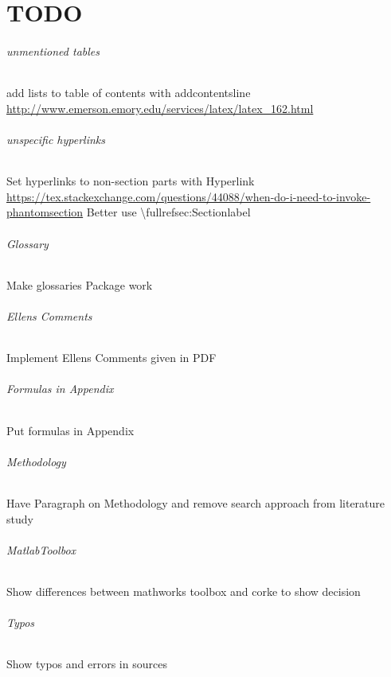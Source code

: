 \part{TODO}

\paragraph{unmentioned tables}
add lists to table of contents with addcontentsline
\url{http://www.emerson.emory.edu/services/latex/latex_162.html}

\paragraph{unspecific hyperlinks}
Set hyperlinks to non-section parts with Hyperlink
\url{https://tex.stackexchange.com/questions/44088/when-do-i-need-to-invoke-phantomsection}
Better use \textbackslash fullref{sec:Sectionlabel}

\paragraph{Glossary}
Make glossaries Package work

\paragraph{Ellens Comments}
Implement Ellens Comments given in PDF

\paragraph{Formulas in Appendix}
Put formulas in Appendix

\paragraph{Methodology}
Have Paragraph on Methodology and remove search approach from literature study

\paragraph{MatlabToolbox}
Show differences between mathworks toolbox and corke to show decision

\paragraph{Typos}
Show typos and errors in sources

